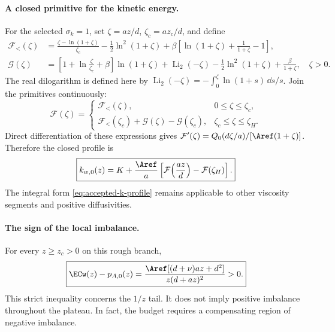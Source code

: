 \paragraph{A closed primitive for the kinetic energy.}
For the selected $\sigma_k=1$, set
$\zeta=az/d$, $\zeta_c=az_c/d$, and define
\begin{align}
 \mathcal F_< (\zeta)
 &=\frac{\zeta-\ln(1+\zeta)}{\zeta_c}
   -\frac12\ln^2(1+\zeta)
   +\beta\left[\ln(1+\zeta)+\frac1{1+\zeta}-1\right],
 \label{eq:accepted-primitive-lower}\\
 \mathcal G(\zeta)
 &=\left[1+\ln\frac{\zeta}{\zeta_c}+\beta\right]\ln(1+\zeta)
   +\operatorname{Li}_2(-\zeta)
   -\frac12\ln^2(1+\zeta)+\frac{\beta}{1+\zeta},
 \quad \zeta>0.
 \label{eq:accepted-primitive-upper}
\end{align}
The real dilogarithm is defined here by
$\operatorname{Li}_2(-\zeta)=-\int_0^\zeta\ln(1+s)\,\dd s/s$.
Join the primitives continuously:
\begin{equation}
 \mathcal F(\zeta)=
 \begin{cases}
 \mathcal F_< (\zeta),&0\leq\zeta\leq\zeta_c,\\
 \mathcal F_< (\zeta_c)+\mathcal G(\zeta)-\mathcal G(\zeta_c),
 &\zeta_c\leq\zeta\leq\zeta_H.
 \end{cases}
 \label{eq:accepted-primitive-joined}
\end{equation}
Direct differentiation of these expressions gives
$\mathcal F'(\zeta)=Q_0(d\zeta/a)/[\Aref(1+\zeta)]$.
Therefore the closed profile is
\begin{equation}
 \boxed{k_{w,0}(z)=K+\frac{\Aref}{a}
 \left[\mathcal F\!\left(\frac{az}{d}\right)
       -\mathcal F(\zeta_H)\right].}
 \label{eq:accepted-k-closed}
\end{equation}
The integral form \cref{eq:accepted-k-profile} remains applicable
to other viscosity segments and positive diffusivities.

\paragraph{The sign of the local imbalance.}
For every $z\geq z_c>0$ on this rough branch,
\begin{equation}
 \boxed{\ECw(z)-p_{A,0}(z)
 =\frac{\Aref[(d+\nu)az+d^2]}{z(d+az)^2}>0.}
 \label{eq:accepted-tail-defect}
\end{equation}
This strict inequality concerns the $1/z$ tail. It does not imply
positive imbalance throughout the plateau. In fact, the budget
requires a compensating region of negative imbalance.

